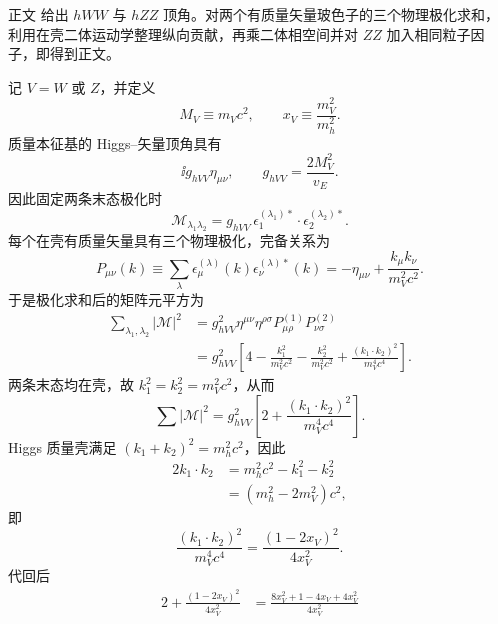 \begin{derivation}
正文 给出 $hWW$ 与 $hZZ$ 顶角。对两个有质量矢量玻色子的三个物理极化求和，利用在壳二体运动学整理纵向贡献，再乘二体相空间并对 $ZZ$ 加入相同粒子因子，即得到正文。

记 $V=W$ 或 $Z$，并定义
\begin{equation*}
M_V\equiv m_Vc^2,
\qquad
x_V\equiv\frac{m_V^2}{m_h^2}.
\end{equation*}
质量本征基的 Higgs--矢量顶角具有
\begin{equation*}
\ii g_{hVV}\eta_{\mu\nu},
\qquad
g_{hVV}=\frac{2M_V^2}{v_E}.
\end{equation*}
因此固定两条末态极化时
\begin{equation*}
\mathcal M_{\lambda_1\lambda_2}
=g_{hVV}\,
\epsilon_{1}^{(\lambda_1)*}\!\cdot
\epsilon_{2}^{(\lambda_2)*}.
\end{equation*}
每个在壳有质量矢量具有三个物理极化，完备关系为
\begin{equation*}
P_{\mu\nu}(k)
\equiv
\sum_\lambda
\epsilon_\mu^{(\lambda)}(k)
\epsilon_\nu^{(\lambda)*}(k)
=-\eta_{\mu\nu}
+\frac{k_\mu k_\nu}{m_V^2c^2}.
\end{equation*}
于是极化求和后的矩阵元平方为
\begin{align*}
\sum_{\lambda_1,\lambda_2}|\mathcal M|^2
&=g_{hVV}^2
\eta^{\mu\nu}\eta^{\rho\sigma}
P^{(1)}_{\mu\rho}P^{(2)}_{\nu\sigma}\\
&=g_{hVV}^2
\left[
4-\frac{k_1^2}{m_V^2c^2}
-\frac{k_2^2}{m_V^2c^2}
+\frac{(k_1\!\cdot k_2)^2}{m_V^4c^4}
\right].
\end{align*}
两条末态均在壳，故 $k_1^2=k_2^2=m_V^2c^2$，从而
\begin{equation*}
\sum|\mathcal M|^2
=g_{hVV}^2
\left[2+\frac{(k_1\!\cdot k_2)^2}{m_V^4c^4}\right].
\end{equation*}
Higgs 质量壳满足 $(k_1+k_2)^2=m_h^2c^2$，因此
\begin{align*}
2k_1\!\cdot k_2
&=m_h^2c^2-k_1^2-k_2^2\\
&=(m_h^2-2m_V^2)c^2,
\end{align*}
即
\begin{equation*}
\frac{(k_1\!\cdot k_2)^2}{m_V^4c^4}
=\frac{(1-2x_V)^2}{4x_V^2}.
\end{equation*}
代回后
\begin{align*}
2+\frac{(1-2x_V)^2}{4x_V^2}
&=\frac{8x_V^2+1-4x_V+4x_V^2}{4x_V^2}\\

\end{align*}
\end{derivation}
